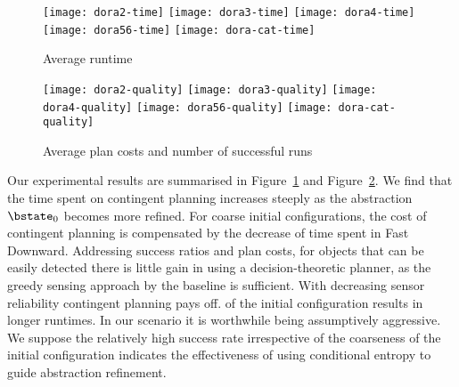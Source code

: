 \begin{figure}[h!]
  \texttt{[image: dora2-time]}\hfill
  \vspace{2mm}
  \texttt{[image: dora3-time]}\hfill
  \vspace{2mm}
  \texttt{[image: dora4-time]}\hfill
  \vspace{2mm}
  \texttt{[image: dora56-time]}\hfill
  \vspace{2mm}
  \texttt{[image: dora-cat-time]}\hfill
  \caption{Average runtime}
  \label{fig:results-time}
\end{figure}

\begin{figure}[h!]
  \texttt{[image: dora2-quality]}\hfill
  \vspace{2mm}
  \texttt{[image: dora3-quality]}\hfill
  \vspace{2mm}
  \texttt{[image: dora4-quality]}\hfill
  \vspace{2mm}
  \texttt{[image: dora56-quality]}\hfill
  \vspace{2mm}
  \texttt{[image: dora-cat-quality]}\hfill
  \caption{Average plan costs and number of successful runs}
  \label{fig:results-quality}
\end{figure}




Our experimental results are summarised in
Figure~\ref{fig:results-time} and Figure~\ref{fig:results-quality}. We
find that the time spent on contingent planning increases steeply as
the abstraction $\bstate_0$ becomes more refined. For coarse initial
configurations, the cost of contingent planning is compensated by the
decrease of time spent in Fast Downward. Addressing success ratios and
plan costs, for objects that can be easily detected there is little
gain in using a decision-theoretic planner, as the greedy sensing
approach by the baseline is sufficient. With decreasing sensor
reliability contingent planning pays off.%
of the initial configuration results in longer runtimes. In our
scenario it is worthwhile being assumptively aggressive.  We suppose
the relatively high success rate irrespective of the coarseness of the
initial configuration indicates the effectiveness of using conditional
entropy to guide abstraction refinement.

